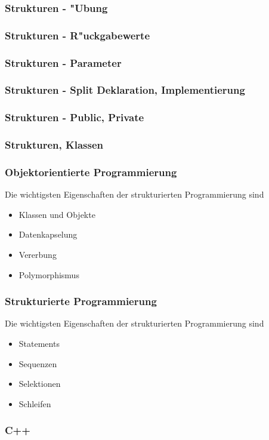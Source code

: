 \documentclass{beamer}
\begin{document}
\begin{frame}[fragile]
	\frametitle{Strukturen - "Ubung}
	{\tiny
	
	}
\end{frame}

\begin{frame}[fragile]
	\frametitle{Strukturen - R"uckgabewerte}
	{\tiny
	
	}
\end{frame}

\begin{frame}[fragile]
	\frametitle{Strukturen - Parameter}
\end{frame}

\begin{frame}[fragile]
	\frametitle{Strukturen - Split Deklaration, Implementierung}
\end{frame}

\begin{frame}[fragile]
	\frametitle{Strukturen - Public, Private}
\end{frame}

\begin{frame}[fragile]
	\frametitle{Strukturen, Klassen}
\end{frame}

\begin{frame}[fragile]
	\frametitle{Objektorientierte Programmierung}
	Die wichtigsten Eigenschaften der strukturierten Programmierung sind
	\begin{itemize}
	\item Klassen und Objekte
	\item Datenkapselung
	\item Vererbung
	\item Polymorphismus
	\end{itemize}
\end{frame}

\begin{frame}[fragile]
	\frametitle{Strukturierte Programmierung}
	Die wichtigsten Eigenschaften der strukturierten Programmierung sind
	\begin{itemize}
	\item Statements
	\item Sequenzen
	\item Selektionen
	\item Schleifen
	\end{itemize}
\end{frame}

\begin{frame}[fragile]
	\frametitle{C++}
\end{frame}
\end{document}
